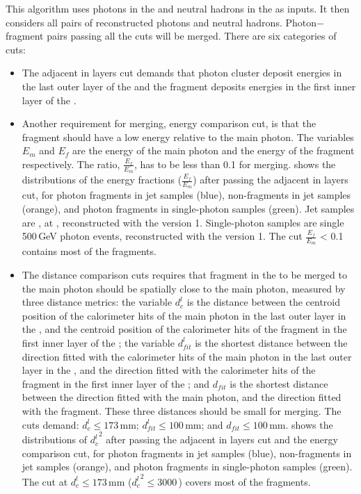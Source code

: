 This algorithm uses photons in the \ECAL and neutral hadrons in the \HCAL as inputs. It then considers all pairs of reconstructed photons and neutral hadrons. Photon$-$fragment pairs passing all the cuts will be merged. There are six categories of cuts:


\begin{itemize}
  \item The adjacent in layers cut demands that  photon cluster deposit energies in the last outer layer of the \ECAL   and  the fragment deposits energies in the first inner layer of the \HCAL.
  \item
Another requirement for merging, energy comparison cut,  is that the fragment should have a low energy relative to the main photon. The variables $E_m$ and $E_f$ are the energy of the main photon  and the energy of the fragment respectively. The ratio, $\frac{E_f}{E_m}$, has to be less than 0.1 for merging.  shows the distributions of  the energy fractions ($\frac{E_f}{E_m}$) after passing the adjacent in layers cut, for photon fragments in jet samples (blue), non-fragments in jet samples (orange), and photon fragments in single-photon samples (green). Jet samples are \eeZuds, at , reconstructed with the \pandora version 1. Single-photon samples are single 500\,GeV photon events,  reconstructed with the \pandora version 1. The cut $\frac{E_f}{E_m}$ < 0.1 contains most of the fragments.
  \item
The distance comparison cuts requires that fragment in the \HCAL to be merged to the main photon  should be spatially close to the main photon, measured by three distance metrics: the variable $d^l_c$ is the distance between the centroid position of the calorimeter hits of the main photon in the last outer layer in the \ECAL, and the centroid position of the calorimeter hits of the fragment in the first inner layer of the \HCAL; the variable $d^l_{fit}$ is the shortest distance between the direction fitted with the calorimeter hits of the main photon in the  last outer layer in the \ECAL, and the direction fitted with  the calorimeter hits of the fragment in the first inner layer of the \HCAL; and $d_{fit}$ is the shortest distance between the direction fitted with the main photon, and the direction fitted with the fragment. These three distances should be small for merging. The cuts demand: $d^l_c \leqslant 173\,\text{mm}$; $d^l_{fit} \leqslant 100\,\text{mm}$; and $d_{fit} \leqslant 100\,\text{mm}$.   shows the distributions of ${d^l_c}^2$  after passing the adjacent in layers cut and the energy comparison cut, for photon fragments in jet samples (blue), non-fragments in jet samples (orange), and photon fragments in single-photon samples (green). The cut at  $d^l_c \leqslant 173$\,mm (${d^l_c}^2 \leqslant 3000$\,) covers most of the fragments.


\end{itemize}
